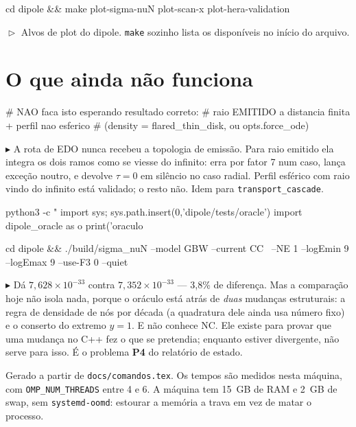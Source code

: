 \documentclass[10pt,a4paper]{article}
\newcommand{\teste}[1]{%
  \par\vspace{1pt}\noindent
  {\color{verde}\footnotesize$\vartriangleright$}\hspace{3pt}%
  {\color{cinza}\footnotesize #1}\par\vspace{7pt}}
\newcommand{\aviso}[1]{%
  \par\vspace{1pt}\noindent
  {\color{ferrugem}\footnotesize$\blacktriangleright$}\hspace{3pt}%
  {\color{cinza}\footnotesize #1}\par\vspace{7pt}}
\begin{document}
\begin{comando}
cd dipole && make plot-sigma-nuN plot-scan-x plot-hera-validation
\end{comando}
\teste{Alvos de plot do dipole. \texttt{make} sozinho lista os
disponíveis no início do arquivo.}

\section{O que ainda não funciona}

\begin{comando}
# NAO faca isto esperando resultado correto:
#   raio EMITIDO a distancia finita + perfil nao esferico
#   (density = flared_thin_disk, ou opts.force_ode)
\end{comando}
\aviso{A rota de EDO nunca recebeu a topologia de emissão. Para raio
emitido ela integra os dois ramos como se viesse do infinito: erra por
fator 7 num caso, lança exceção noutro, e devolve $\tau = 0$ em silêncio
no caso radial. Perfil esférico com raio vindo do infinito está
validado; o resto não. Idem para \texttt{transport\_cascade}.}

\begin{comando}
python3 -c "
import sys; sys.path.insert(0,'dipole/tests/oracle')
import dipole_oracle as o
print('oraculo  %

cd dipole && ./build/sigma_nuN --model GBW --current CC \
    --NE 1 --logEmin 9 --logEmax 9 --use-F3 0 --quiet
\end{comando}
\aviso{Dá $7{,}628\times10^{-33}$ contra $7{,}352\times10^{-33}$ --- 3,8\%
de diferença. Mas a comparação hoje não isola nada, porque o oráculo
está atrás de \emph{duas} mudanças estruturais: a regra de densidade de
nós por década (a quadratura dele ainda usa número fixo) e o conserto do
extremo $y=1$. E não conhece NC. Ele existe para provar que uma mudança
no C++ fez o que se pretendia; enquanto estiver divergente, não serve
para isso. É o problema \textbf{P4} do relatório de estado.}

\vfill
{\footnotesize\color{cinza}
Gerado a partir de \texttt{docs/comandos.tex}. Os tempos são medidos
nesta máquina, com \texttt{OMP\_NUM\_THREADS} entre 4 e 6.
A máquina tem 15~GB de RAM e 2~GB de swap, sem \texttt{systemd-oomd}:
estourar a memória a trava em vez de matar o processo.}
\end{document}
